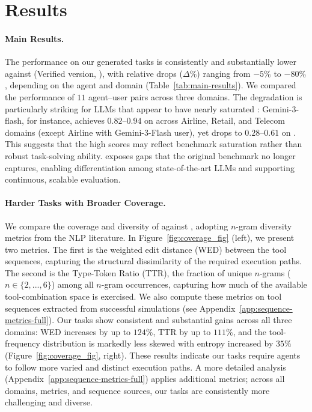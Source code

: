 \section{Results}
\label{sec:results}

\paragraph{Main Results.} The performance on our generated tasks is consistently and substantially lower against \taubench (Verified version, \tbv), with relative drops ($\Delta\%$) ranging from $-5\%$ to $-80\%$, depending on the agent and domain (Table~\ref{tab:main-results}). We compared the performance of $11$ agent--user pairs across three domains. The degradation is particularly striking for LLMs that appear to have nearly saturated \tbv: Gemini-$3$-flash, for instance, achieves $0.82$--$0.94$ on \tbv across Airline, Retail, and Telecom domains (except Airline with Gemini-$3$-Flash user), yet drops to $0.28$--$0.61$ on \ourbenchmark. This suggests that the high \tbv scores may reflect benchmark saturation rather than robust task-solving ability. \ourbenchmark exposes gaps that the original benchmark no longer captures, enabling differentiation among state-of-the-art LLMs and supporting continuous, scalable evaluation.



\paragraph{Harder Tasks with Broader Coverage.}
We compare the coverage and diversity of \ourbenchmark against \tbv, adopting $n$-gram diversity metrics from the NLP literature.
In Figure~\ref{fig:coverage_fig} (left), we present two metrics.
The first is the weighted edit distance (WED) between the tool sequences, capturing the structural dissimilarity of the required execution paths. The second is the Type-Token Ratio (TTR), the fraction of unique $n$-grams ($n\in\{2,...,6\}$) among all $n$-gram occurrences, capturing how much of the available tool-combination space is exercised. We also compute these metrics on tool sequences extracted from successful simulations (see Appendix~\ref{app:sequence-metrics-full}).
Our tasks show consistent and substantial gains across all three domains: WED increases by up to $124\%$, TTR by up to $111\%$, 
and the tool-frequency distribution is markedly less skewed with entropy increased by $35\%$ (Figure~\ref{fig:coverage_fig}, right).
These results indicate our tasks require agents to follow more varied and distinct execution paths. A more detailed analysis (Appendix~\ref{app:sequence-metrics-full}) applies additional metrics; across all domains, metrics, and sequence sources, our tasks are consistently more challenging and diverse.

